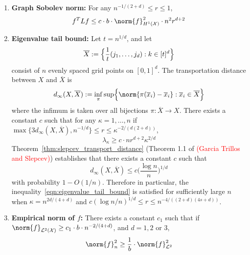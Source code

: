 \documentclass{article}
\newcommand{\1}{\mathbf{1}}
\newcommand{\Xset}{\mathcal{X}}
\newcommand{\Leb}{\mathcal{L}}
\newcommand{\ol}[1]{\overline{#1}}
\theoremstyle{alden}
\theoremstyle{aldenthm}
\theoremstyle{definition}
\theoremstyle{remark}
\begin{document}
\begin{enumerate}[label=(E\arabic*)]
	\item 
	\label{event:discrete_sobolev_norm_order1}
	\textbf{Graph Sobolev norm:} For any $n^{-1/(2 + d)}\leq r \leq 1$,
	\begin{equation}
	\label{eqn:continuous_to_discrete_sobolev_norm_order1}
	f^T L f \leq c \cdot b \cdot \norm{f}_{H^1(\Xset)}^2 \cdot n^{2} r^{d + 2} 
	\end{equation}
	\item 
	\label{event:eigenvalue_tail_decay}
	\textbf{Eigenvalue tail bound:} Let $t = n^{1/d}$, and let
	\begin{equation*}
	\overline{X} := \Bigl\{\frac{1}{t}(j_1,\ldots,j_d): k \in [t]^d\Bigr\}
	\end{equation*} 
	consist of $n$ evenly spaced grid points on $[0,1]^d$. The transportation distance between $X$ and $\ol{X}$ is
	\begin{equation*}
	d_{\infty}(X,\overline{X}) := \inf_{\pi} \sup\Bigl\{\norm{\pi(\ol{x}_i) - \ol{x}_i}: \ol{x}_i \in \ol{X}\Bigr\}
	\end{equation*}
	where the infimum is taken over all bijections $\pi: \ol{X} \to X$. 
	There exists a constant $c$ such that for any $\kappa = 1,\ldots,n$ if $\max\{ 3 d_{\infty}(X,\ol{X}),n^{-1/d}\} \leq r \leq \kappa^{-2/(d(2 +d))}$, 
	\begin{equation}
	\label{eqn:eigenvalue_tail_bound}
	\lambda_{\kappa} \geq c \cdot n r^{d + 2} \kappa^{2/d}
	\end{equation}
	Theorem~\ref{thm:slepcev_transport_distance} (Theorem 1.1 of \textcolor{red}{(Garcia Trillos and Slepcev)}) establishes that there exists a constant $c$ such that 
	\begin{equation*}
	d_{\infty}(X,\ol{X}) \leq c\biggl(\frac{\log n}{n}\biggr)^{1/d}
	\end{equation*}
	with probability $1  - O(1/n)$. Therefore in particular, the inequality~\eqref{eqn:eigenvalue_tail_bound} is satisfied for sufficiently large $n$ when $\kappa = n^{2d/(4 + d)}$ and $c(\log n/n)^{1/d} \leq r \leq n^{-4/((2+d)(4s + d))}$. 
	\item 
	\label{event:l2_norm}
	\textbf{Empirical norm of $f$:} There exists a constant $c_1$ such that if $\norm{f}_{\Leb^2(\Xset)} \geq c_1 \cdot b \cdot n^{-2/(4 + d)}$, and $d = 1,2$ or $3$,
	\begin{equation}
	\label{eqn:l2_to_empirical_norm}
	\norm{f}_n^2 \geq \frac{1}{b} \cdot \norm{f}_{\Leb^2}^2
	\end{equation}
\end{enumerate} 
\end{document}
